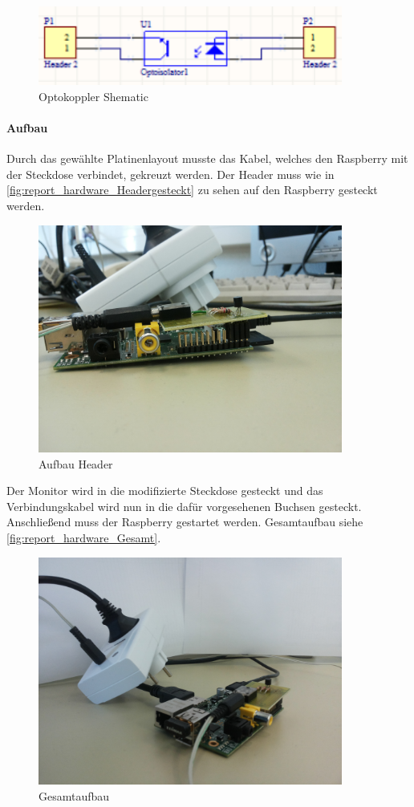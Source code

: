 \begin{figure}[H]
\centering
\includegraphics[keepaspectratio=true, width=10cm]{images/rpi/Optokoppler_Schematic.png}
\caption{Optokoppler Shematic}
\label{fig:report_hardware_OptSche}
\end{figure}
\paragraph{Aufbau}
Durch das gewählte Platinenlayout musste das Kabel, welches den Raspberry mit der Steckdose verbindet, gekreuzt werden. Der Header muss wie in \autoref{fig:report_hardware_Headergesteckt} zu sehen auf den Raspberry gesteckt werden.\\
\begin{figure}[H]
\centering
\includegraphics[keepaspectratio=true, width=10cm]{images/rpi/rpi_header_gesteckt.jpg}
\caption{Aufbau Header}
\label{fig:report_hardware_Headergesteckt}
\end{figure}
 Der Monitor wird in die modifizierte Steckdose gesteckt und das Verbindungskabel wird nun in die dafür vorgesehenen Buchsen gesteckt. Anschließend muss der Raspberry gestartet werden. Gesamtaufbau siehe \autoref{fig:report_hardware_Gesamt}.
 \begin{figure}[H]
 \centering
 \includegraphics[keepaspectratio=true, width=10cm]{images/rpi/rpi_gesamt.jpg}
 \caption{Gesamtaufbau}
 \label{fig:report_hardware_Gesamt}
 \end{figure}